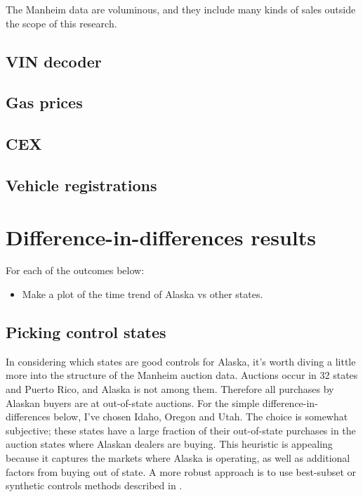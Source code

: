 \documentclass[11pt,letterpaper,oneside]{article}
\begin{document}
The Manheim data are voluminous, and they include many kinds of sales outside the scope of this research.

\subsection{VIN decoder}
\subsection{Gas prices}
\subsection{CEX}
\subsection{Vehicle registrations}


\section[DD Results]{Difference-in-differences results}

For each of the outcomes below:
\begin{itemize}
    \item Make a plot of the time trend of Alaska vs other states.
\end{itemize}


\subsection{Picking control states}
In considering which states are good controls for Alaska, it's worth diving a little more into the structure of the Manheim auction data.
Auctions occur in 32 states and Puerto Rico, and Alaska is not among them.
Therefore all purchases by Alaskan buyers are at out-of-state auctions.
For the simple difference-in-differences below, I've chosen Idaho, Oregon and Utah.
The choice is somewhat subjective; these states have a large fraction of their out-of-state purchases in the auction states where Alaskan dealers are buying.
This heuristic is appealing because it captures the markets where Alaska is operating, as well as additional factors from buying out of state.
A more robust approach is to use best-subset or synthetic controls methods described in \textcite{DoudchenkoImbens2016DD}.
\end{document}
